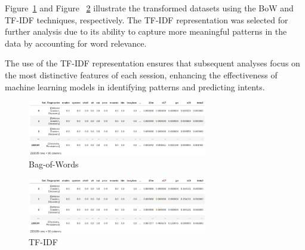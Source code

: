         Figure~\ref{fig:bow} and Figure ~\ref{fig:tf-idf} illustrate the transformed datasets using the BoW and TF-IDF techniques, respectively. The TF-IDF representation was selected for further analysis due to its ability to capture more meaningful patterns in the data by accounting for word relevance.

        The use of the TF-IDF representation ensures that subsequent analyses focus on the most distinctive features of each session, enhancing the effectiveness of machine learning models in identifying patterns and predicting intents.
        
        \begin{figure}[H]
            \centering
            \includegraphics[width=0.70\textwidth]{../figures/others/dataset_bow_1.png}
            \vspace{-0.3cm}
            \caption{Bag-of-Words}
            \label{fig:bow}
        \end{figure}
        
        \vspace{-0.5cm}
        
        \begin{figure}[H]
            \centering
            \includegraphics[width=0.70\textwidth]{../figures/others/dataset_tf-idf_1.png}
            \vspace{-0.3cm}
            \caption{TF-IDF}
            \label{fig:tf-idf}
        \end{figure}
